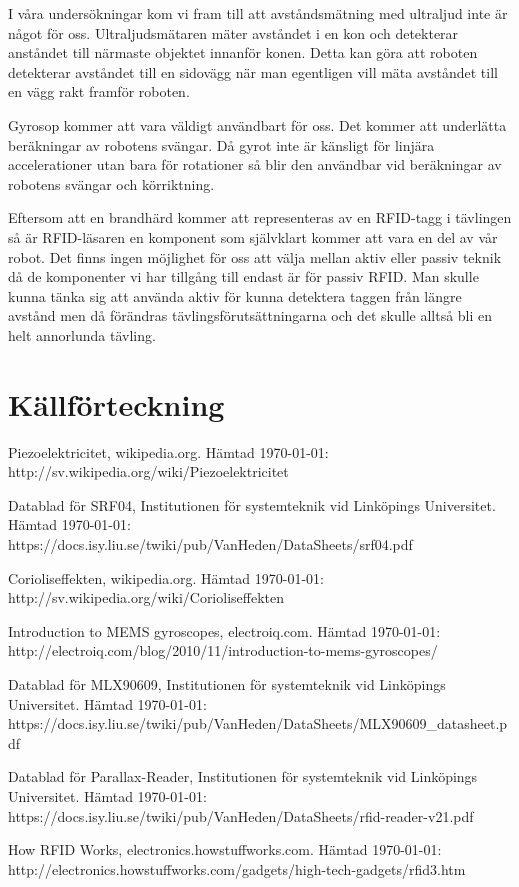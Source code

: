 \documentclass[a4paper,12pt,fleqn]{article}
\begin{document}
I våra undersökningar kom vi fram till att avståndsmätning med ultraljud inte är något för oss. Ultraljudsmätaren mäter avståndet i en kon och detekterar anståndet till närmaste objektet innanför konen. Detta kan göra att roboten detekterar avståndet till en sidovägg när man egentligen vill mäta avståndet till en vägg rakt framför roboten.

Gyrosop kommer att vara väldigt användbart för oss. Det kommer att underlätta beräkningar av robotens svängar. Då gyrot inte är känsligt för linjära accelerationer utan bara för rotationer så blir den användbar vid beräkningar av robotens svängar och körriktning.

Eftersom att en brandhärd kommer att representeras av en RFID-tagg i tävlingen så är RFID-läsaren en komponent som självklart kommer att vara en del av vår robot. Det finns ingen möjlighet för oss att välja mellan aktiv eller passiv teknik då de komponenter vi har tillgång till endast är för passiv RFID. Man skulle kunna tänka sig att använda aktiv för kunna detektera taggen från längre avstånd men då förändras tävlingsförutsättningarna och det skulle alltså bli en helt annorlunda tävling.

\section{Källförteckning}

Piezoelektricitet, wikipedia.org. Hämtad \today:
http://sv.wikipedia.org/wiki/Piezoelektricitet

Datablad för SRF04, Institutionen för systemteknik vid Linköpings Universitet. Hämtad \today:
https://docs.isy.liu.se/twiki/pub/VanHeden/DataSheets/srf04.pdf

Corioliseffekten, wikipedia.org. Hämtad \today:
http://sv.wikipedia.org/wiki/Corioliseffekten

Introduction to MEMS gyroscopes, electroiq.com. Hämtad \today:
http://electroiq.com/blog/2010/11/introduction-to-mems-gyroscopes/

Datablad för MLX90609, Institutionen för systemteknik vid Linköpings Universitet. Hämtad \today: https://docs.isy.liu.se/twiki/pub/VanHeden/DataSheets/MLX90609_datasheet.pdf

Datablad för Parallax-Reader, Institutionen för systemteknik vid Linköpings Universitet. Hämtad \today:
https://docs.isy.liu.se/twiki/pub/VanHeden/DataSheets/rfid-reader-v21.pdf

How RFID Works, electronics.howstuffworks.com. Hämtad \today:
http://electronics.howstuffworks.com/gadgets/high-tech-gadgets/rfid3.htm
\end{document}
